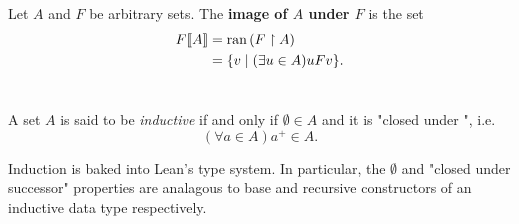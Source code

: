 \documentclass{report}
\begin{document}
\begin{definition}

  \statementpadding




\end{definition}

\section{}%

Let $A$ and $F$ be arbitrary sets.
The \textbf{image of $A$ under $F$} is the set
  \begin{align*}
    F\!\left\llbracket A\right\rrbracket
      & = \mathop{\text{ran}}{(F \restriction A)} \\
      & = \{v \mid (\exists u \in A) uFv\}.
  \end{align*}

\begin{definition}

  \statementpadding



\end{definition}

\section{}%

A set $A$ is said to be \textit{inductive} if and only if $\emptyset \in A$ and
  it is "closed under ", i.e.
  $$(\forall a \in A) a^+ \in A.$$

\begin{note}
  Induction is baked into Lean's type system.
  In particular, the $\emptyset$ and "closed under successor" properties are
    analagous to base and recursive constructors of an inductive data type
    respectively.
\end{note}

\begin{definition}

  \statementpadding



\end{definition}
\end{document}

